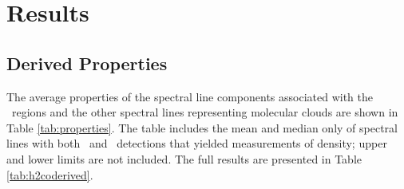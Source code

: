 % 
% 


\section{Results}
\label{sec:results}
\subsection{Derived Properties}
The average properties of the spectral line components associated with the \uchii\ regions
and the other spectral lines representing molecular clouds are
shown in Table \ref{tab:properties}.  The table includes the mean and median
only of spectral lines with both \oneone\ and \twotwo\ detections that yielded
measurements of density; upper and lower limits are not included.  The full
results are presented in Table \ref{tab:h2coderived}.


